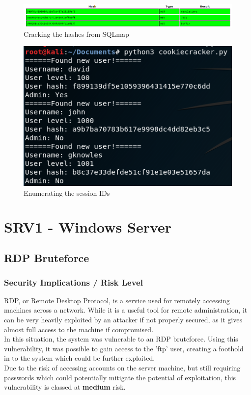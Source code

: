 \documentclass{report}
\begin{document}
\begin{figure}[!htb]
	\centering
	\includegraphics[scale=0.5]{img/crackstation.png}
	\caption{Cracking the hashes from SQLmap}
\end{figure}
\begin{figure}[!htb]
	\centering
	\includegraphics[scale=0.6]{img/cookie1.png}
	\caption{Enumerating the session IDs}
\end{figure}



\section{SRV1 - Windows Server}
\subsection{RDP Bruteforce}
\subsubsection{Security Implications / Risk Level}
RDP, or Remote Desktop Protocol, is a service used for remotely accessing machines across a network. While it is a useful tool for remote administration, it can be very heavily exploited by an attacker if not properly secured, as it gives almost full access to the machine if compromised. \\
In this situation, the system was vulnerable to an RDP bruteforce. Using this vulnerability, it was possible to gain access to the 'ftp' user, creating a foothold in to the system which could be further exploited.\\
Due to the risk of accessing accounts on the server machine, but still requiring passwords which could potentially mitigate the potential of exploitation, this vulnerability is classed at \textbf{medium} risk.
\end{document}
